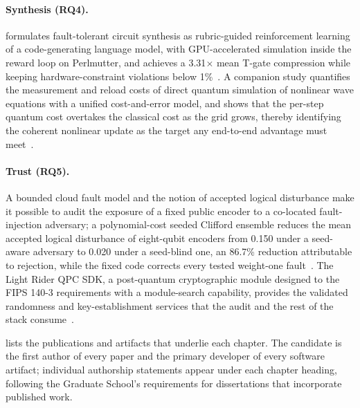 \paragraph{Synthesis (RQ4).}
\rubriq{} formulates fault-tolerant circuit synthesis as rubric-guided reinforcement learning of a code-generating language model, with GPU-accelerated simulation inside the reward loop on Perlmutter, and achieves a 3.31$\times$ mean T-gate compression while keeping hardware-constraint violations below 1\%~\cite{guo2026rubriq}. A companion study quantifies the measurement and reload costs of direct quantum simulation of nonlinear wave equations with a unified cost-and-error model, and shows that the per-step quantum cost overtakes the classical cost as the grid grows, thereby identifying the coherent nonlinear update as the target any end-to-end advantage must meet~\cite{guo2026nonlinearwaves}.

\paragraph{Trust (RQ5).}
A bounded cloud fault model and the notion of accepted logical disturbance make it possible to audit the exposure of a fixed public encoder to a co-located fault-injection adversary; a polynomial-cost seeded Clifford ensemble reduces the mean accepted logical disturbance of eight-qubit encoders from 0.150 under a seed-aware adversary to 0.020 under a seed-blind one, an 86.7\% reduction attributable to rejection, while the fixed  code corrects every tested weight-one fault~\cite{guo2026qecaudit}. The Light Rider QPC SDK, a post-quantum cryptographic module designed to the FIPS 140-3 requirements with a module-search capability, provides the validated randomness and key-establishment services that the audit and the rest of the stack consume~\cite{guo2026lightriderqpc}.

 lists the publications and artifacts that underlie each chapter. The candidate is the first author of every paper and the primary developer of every software artifact; individual authorship statements appear under each chapter heading, following the Graduate School's requirements for dissertations that incorporate published work.

